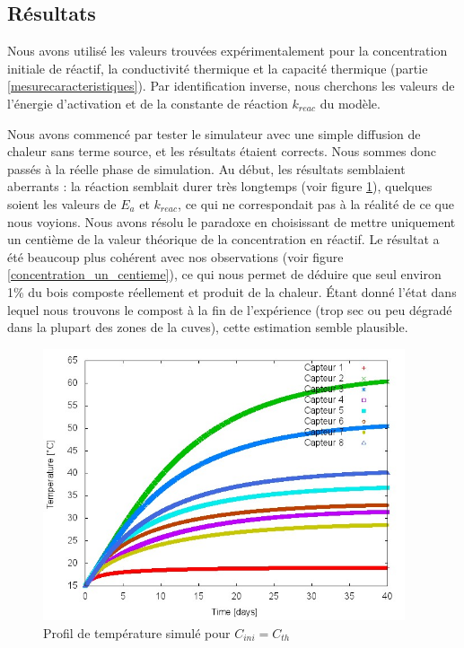 \documentclass[../PS6_RapportFinal.tex]{subfiles}
\begin{document}
\graphicspath{{img/}{tex/img/}}
\subsection{Résultats}

Nous avons utilisé les valeurs trouvées expérimentalement pour la concentration initiale de réactif, la conductivité thermique et la capacité thermique (partie \ref{mesurecaracteristiques}). Par identification inverse, nous cherchons les valeurs de l'énergie d'activation et de la constante de réaction $k_{reac}$ du modèle.

Nous avons commencé par tester le simulateur avec une simple diffusion de chaleur sans terme source, et les résultats étaient corrects. Nous sommes donc passés à la réelle phase de simulation.
Au début, les résultats semblaient aberrants : la réaction semblait durer très longtemps (voir figure \ref{concentration_trop_grande}), quelques soient les valeurs de $E_{a}$ et $k_{reac}$, ce qui ne correspondait pas à la réalité de ce que nous voyions. Nous avons résolu le paradoxe en choisissant de mettre uniquement un centième de la valeur théorique de la concentration en réactif. Le résultat a été beaucoup plus cohérent avec nos observations (voir figure \ref{concentration_un_centieme}), ce qui nous permet de déduire que seul environ 1\% du bois composte réellement et produit de la chaleur. Étant donné l'état dans lequel nous trouvons le compost à la fin de l'expérience (trop sec ou peu dégradé dans la plupart des zones de la cuves), cette estimation semble plausible.

\begin{figure}[!h]
\begin{center}
\includegraphics[height=8cm]{2_4_concentration_trop_grande.jpg}
\caption{Profil de température simulé pour $C_{ini} = C_{th}$}
\label{concentration_trop_grande}
\end{center}
\end{figure}
\end{document}
